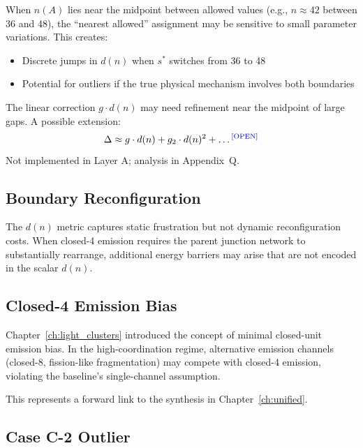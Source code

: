 When $n(A)$ lies near the midpoint between allowed values (e.g., $n \approx 42$
between 36 and 48), the ``nearest allowed'' assignment may be sensitive to
small parameter variations. This creates:
\begin{itemize}
    \item Discrete jumps in $d(n)$ when $s^*$ switches from 36 to 48
    \item Potential for outliers if the true physical mechanism involves
          both boundaries
\end{itemize}

\begin{edcopenbox}[title=Open Problem: Edge Effects]
    The linear correction $g \cdot d(n)$ may need refinement near the
    midpoint of large gaps. A possible extension:
    \begin{equation}
        \Delta \approx g \cdot d(n) + g_2 \cdot d(n)^2 + \ldots \tagOpen
    \end{equation}
    Not implemented in Layer A; analysis in Appendix~Q.
\end{edcopenbox}

\subsection{Boundary Reconfiguration}

The $d(n)$ metric captures static frustration but not dynamic reconfiguration
costs. When closed-4 emission requires the parent junction network to
substantially rearrange, additional energy barriers may arise that are not
encoded in the scalar $d(n)$. \tagOpen

\subsection{Closed-4 Emission Bias}

Chapter~\ref{ch:light_clusters} introduced the concept of minimal closed-unit
emission bias. In the high-coordination regime, alternative emission
channels (closed-8, fission-like fragmentation) may compete with closed-4
emission, violating the baseline's single-channel assumption.

This represents a forward link to the synthesis in Chapter~\ref{ch:unified}.
\tagOpen

\subsection{Case C-2 Outlier}

